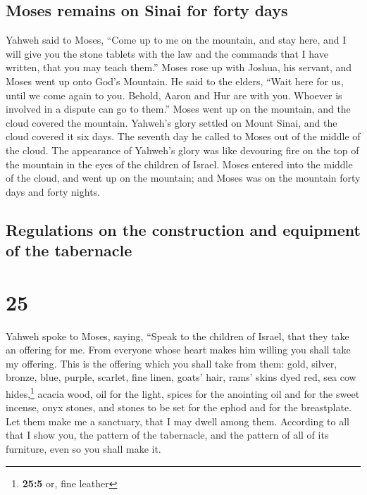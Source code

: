 \hypertarget{moses-remains-on-sinai-for-forty-days}{%
\subsection{Moses remains on Sinai for forty
days}\label{moses-remains-on-sinai-for-forty-days}}

 Yahweh said to Moses, ``Come up to me on the mountain,
and stay here, and I will give you the stone tablets with the law and
the commands that I have written, that you may teach them.''
 Moses rose up with Joshua, his servant, and Moses went
up onto God's Mountain.  He said to the elders, ``Wait
here for us, until we come again to you. Behold, Aaron and Hur are with
you. Whoever is involved in a dispute can go to them.'' 
Moses went up on the mountain, and the cloud covered the mountain.
 Yahweh's glory settled on Mount Sinai, and the cloud
covered it six days. The seventh day he called to Moses out of the
middle of the cloud.  The appearance of Yahweh's glory
was like devouring fire on the top of the mountain in the eyes of the
children of Israel.  Moses entered into the middle of the
cloud, and went up on the mountain; and Moses was on the mountain forty
days and forty nights.

\hypertarget{regulations-on-the-construction-and-equipment-of-the-tabernacle}{%
\subsection{Regulations on the construction and equipment of the
tabernacle}\label{regulations-on-the-construction-and-equipment-of-the-tabernacle}}

\hypertarget{section-24}{%
\section{25}\label{section-24}}

 Yahweh spoke to Moses, saying,  ``Speak to
the children of Israel, that they take an offering for me. From everyone
whose heart makes him willing you shall take my offering. 
This is the offering which you shall take from them: gold, silver,
bronze,  blue, purple, scarlet, fine linen, goats' hair,
 rams' skins dyed red, sea cow hides,\footnote{\textbf{25:5}
  or, fine leather} acacia wood,  oil for the light,
spices for the anointing oil and for the sweet incense, 
onyx stones, and stones to be set for the ephod and for the breastplate.
 Let them make me a sanctuary, that I may dwell among
them.  According to all that I show you, the pattern of
the tabernacle, and the pattern of all of its furniture, even so you
shall make it.

